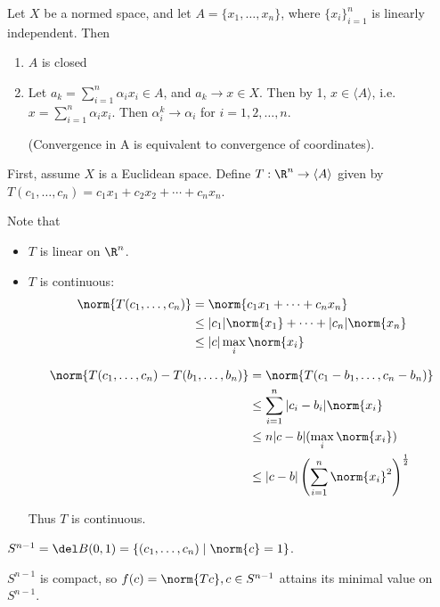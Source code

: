 \documentclass[x11names,reqno,14pt]{extarticle}
\begin{document}
Let $X$ be a normed space, and let $A = \{x_1, \dots, x_n\}$, where $\{x_i\}_{i=1}^n$ is linearly independent. Then
\begin{enumerate}

\item $A$ is closed

\item Let $a_k = \sum_{i=1}^n\alpha_ix_i \in A$, and $a_k \to x \in X$. Then by 1, $x \in \langle A \rangle$, i.e. $x = \sum_{i=1}^n\alpha_ix_i$. Then $\alpha_i^k\to\alpha_i$ for $i = 1, 2, \dots, n$. 

(Convergence in A is equivalent to convergence of coordinates).

\end{enumerate}

\proof

First, assume $X$ is a Euclidean space. Define $T:\R^n\to\langle A \rangle$ given by $T(c_1,\dots, c_n) = c_1x_1 + c_2x_2 + \cdots + c_nx_n$. 

Note that
\begin{itemize}

\item $T$ is linear on $\R^n$. 

\item $T$ is continuous:
\begin{align*}
\norm{T(c_1, \dots, c_n)} & = \norm{c_1x_1 + \cdots + c_nx_n} \\
& \leq |c_1|\norm{x_1} + \cdots + |c_n|\norm{x_n} \\
& \leq |c|\max_i\norm{x_i}
\end{align*}

\begin{align*}
\norm{T(c_1, \dots, c_n) - T(b_1, \dots, b_n)} & = \norm{T(c_1 - b_1, \dots, c_n - b_n)} \\
& \leq \sum_{i=1}^n|c_i - b_i|\norm{x_i} \\
& \leq n|c - b|(\max_i\norm{x_i}) \\
& \leq |c - b|\left(\sum_{i=1}^n\norm{x_i}^2\right)^{\frac12}
\end{align*}

Thus $T$ is continuous.

\end{itemize}

$S^{n - 1} = \del B(0, 1) = \{(c_1, \dots, c_n) \mid \norm{c} =1 \}$. 

$S^{n - 1}$ is compact, so $f(c) = \norm{Tc}, c \in S^{n - 1}$ attains its minimal value on $S^{n - 1}$. 
\end{document}
